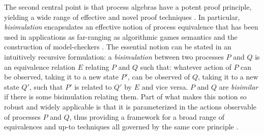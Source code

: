 The second central point is that process algebras have a potent proof
principle, yielding a wide range of effective and novel proof
techniques \cite{MilnerS92} \cite{SangiorgiWalker} \cite{Sangiorgi95}
\cite{hop}. In particular, \emph{bisimulation} encapsulates an effective
notion of process equivalence that has been used in applications as
far-ranging as algorithmic games semantics
\cite{Abramsky2005Algorithmic-Gam} and the construction of
model-checkers \cite{Caires04}. The essential notion can be stated in
an intuitively recursive formulation: a \emph{bisimulation} between two
processes $P$ and $Q$ is an equivalence relation $E$ relating $P$
and $Q$ such that: whatever action of $P$ can be observed, taking it
to a new state $P'$, can be observed of $Q$, taking it to a new state
$Q'$, such that $P'$ is related to $Q'$ by $E$ and vice versa. $P$ and
$Q$ are \emph{bisimilar} if there is some bisimulation relating
them. Part of what makes this notion so robust and widely applicable
is that it is parameterized in the actions observable of processes
$P$ and $Q$, thus providing a framework for a broad range of
equivalences and up-to techniques \cite{milner92techniques} all governed by the same core
principle \cite{SangiorgiWalker} \cite{Sangiorgi95} \cite{hop}.
